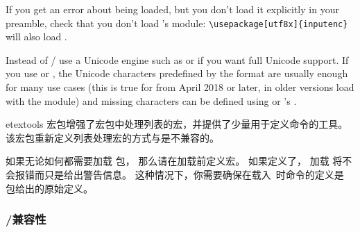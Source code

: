 \begin{marglist}
If you get an error about  being loaded, but you don't load it explicitly in your preamble, check that you don't load 's  module: \verb|\usepackage[utf8x]{inputenc}| will also load .

Instead of / use a Unicode engine such as \xetex or \luatex if you want full Unicode support. If you use \pdftex or \tex, the Unicode characters predefined by the \latex format are usually enough for many use cases (this is true for \latex from April 2018 or later, in older versions load  with the  module) and missing characters can be defined using  or 's .

\item[etextools]
宏包增强了宏包中处理列表的宏，并提供了少量用于定义命令的工具。
该宏包重新定义列表处理宏的方式与\biblatex 是不兼容的。



如果无论如何都需要加载  包，
那么请在加载\biblatex 前定义宏。
如果定义了， 加载  将不会报错而只是给出警告信息。
这种情况下，你需要确保在载入\biblatex\ 时命令的定义是 包给出的原始定义。


\end{marglist}

\subsubsection{\biber/\biblatex 兼容性}
\label{int:pre:bibercompat}

